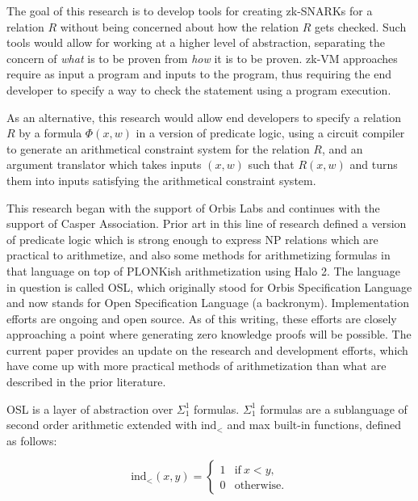\documentclass[11pt]{article}
\begin{document}
The goal of this research is to develop tools for creating zk-SNARKs for a relation $R$ without being concerned about how the relation $R$ gets checked. Such tools would allow for working at a higher level of abstraction, separating the concern of \emph{what}\/ is to be proven from \emph{how}\/ it is to be proven. zk-VM approaches require as input a program and inputs to the program, thus requiring the end developer to specify a way to check the statement using a program execution.

As an alternative, this research would allow end developers to specify a relation $R$ by a formula $\Phi(x, w)$ in a version of predicate logic, using a circuit compiler to generate an arithmetical constraint system for the relation $R$, and an argument translator which takes inputs $(x, w)$ such that $R(x, w)$ and turns them into inputs satisfying the arithmetical constraint system.

This research began with the support of Orbis Labs and continues with the support of Casper Association. Prior art in this line of research \cite{sigma11,osl-paper,sigma11-poly-bounds} defined a version of predicate logic which is strong enough to express NP relations which are practical to arithmetize, and also some methods for arithmetizing formulas in that language on top of PLONKish arithmetization using Halo 2. \cite{halo2-book,halo2-github} The language in question is called OSL, which originally stood for Orbis Specification Language and now stands for Open Specification Language (a backronym). Implementation efforts \cite{osl-github} are ongoing and open source. As of this writing, these efforts are closely approaching a point where generating zero knowledge proofs will be possible. The current paper provides an update on the research and development efforts, which have come up with more practical methods of arithmetization than what are described in the prior literature.

OSL is a layer of abstraction over $\Sigma^1_1$ formulas. $\Sigma^1_1$ formulas are a sublanguage of second order arithmetic \cite{simpson} extended with $\text{ind}_<$ and max built-in functions, defined as follows:

\begin{equation}
	\text{ind}_<(x, y) = \begin{cases}
		1 & \text{if}\ x < y, \\
		0 & \text{otherwise}.
	\end{cases}
\end{equation}
\end{document}
